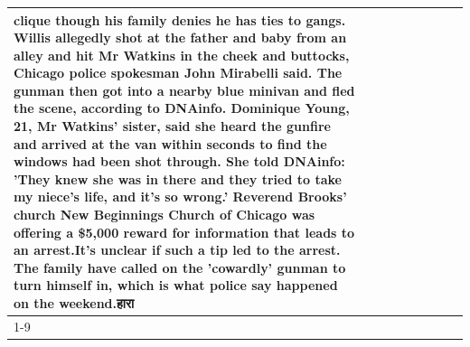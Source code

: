 \begin{table}[H]
\begin{tabular}{lllrlllll}
clique though his family denies he has ties to gangs. Willis allegedly shot at the father and baby from an alley and hit Mr Watkins in the cheek and buttocks, Chicago police spokesman John Mirabelli said. The gunman then got into a nearby blue minivan and fled the scene, according to DNAinfo. Dominique Young, 21, Mr Watkins' sister, said she heard the gunfire and arrived at the van within seconds to find the windows had been shot through. She told DNAinfo: 'They knew she was in there and they tried to take my niece's life, and it's so wrong.' Reverend Brooks' church New Beginnings Church of Chicago was offering a \$5,000 reward for information that leads to an arrest.It's unclear if such a tip led to the arrest. The family have called on the 'cowardly' gunman to turn himself in, which is what police say happened on the weekend.हारा \\
\cline{1-9}

\end{tabular}
\end{table}
